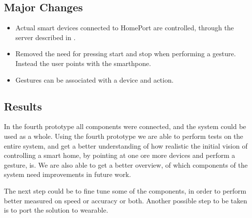 \subsection{Major Changes}

\begin{itemize}
\item Actual smart devices connected to HomePort are controlled, through the server described in .
\item Removed the need for pressing start and stop when performing a gesture. Instead the user points with the smarthpone.
\item Gestures can be associated with a device and action.
\end{itemize}

\subsection{Results}

In the fourth prototype all components were connected, 
and the system could be used as a whole. 
Using the fourth prototype we are able to perform tests on the entire system, 
and get a better understanding of how realistic the initial vision of controlling a smart home, 
by pointing at one ore more devices and perform a gesture, is. 
We are also able to get a better overview, 
of which components of the system need improvements in future work.

The next step could be to fine tune some of the components, 
in order to perform better measured on speed or accuracy or both. 
Another possible step to be taken is to port the solution to wearable.

